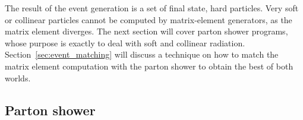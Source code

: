 The result of the event generation is a set of final state, hard particles. Very
soft or collinear particles cannot be computed by matrix-element generators, as the matrix element
diverges. The next section will cover parton shower programs, whose purpose is exactly to deal with
soft and collinear radiation. Section~\ref{sec:event_matching} will discuss a technique on how to
match the matrix element computation with the parton shower to obtain the best of both worlds. 



\subsection{Parton shower}




